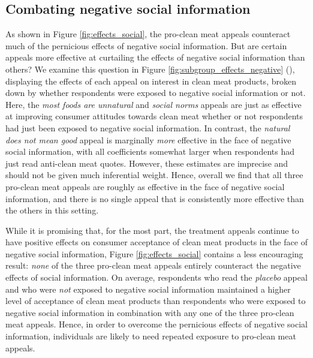 \documentclass[12pt]{article}
\begin{document}
\subsection{Combating negative social information}

As shown in Figure \ref{fig:effects_social}, the pro-clean meat appeals counteract much of the pernicious effects of negative social information. But are certain appeals more effective at curtailing the effects of negative social information than others? We examine this question in Figure \ref{fig:subgroup_effects_negative} (), displaying the effects of each appeal on interest in clean meat products, broken down by whether respondents were exposed to negative social information or not. Here, the \textit{most foods are unnatural} and \textit{social norms} appeals are just as effective at improving consumer attitudes towards clean meat whether or not respondents had just been exposed to negative social information. In contrast, the \textit{natural does not mean good} appeal is marginally \textit{more} effective in the face of negative social information, with all coefficients somewhat larger when respondents had just read anti-clean meat quotes. However, these estimates are imprecise and should not be given much inferential weight. Hence, overall we find that all three pro-clean meat appeals are roughly as effective in the face of negative social information, and there is no single appeal that is consistently more effective than the others in this setting.



While it is promising that, for the most part, the treatment appeals continue to have positive effects on consumer acceptance of clean meat products in the face of negative social information, Figure \ref{fig:effects_social} contains a less encouraging result: \textit{none} of the three pro-clean meat appeals entirely counteract the negative effects of social information. On average, respondents who read the \textit{placebo} appeal and who were \textit{not} exposed to negative social information maintained a higher level of acceptance of clean meat products than respondents who were exposed to negative social information in combination with any one of the three pro-clean meat appeals. Hence, in order to overcome the pernicious effects of negative social information, individuals are likely to need repeated exposure to pro-clean meat appeals.
\end{document}
